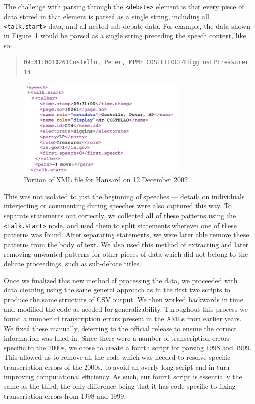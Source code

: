 \documentclass[
  letterpaper,
  DIV=11,
  numbers=noendperiod]{scrartcl}
\begin{document}
The challenge with parsing through the
\texttt{\textless{}debate\textgreater{}} element is that every piece of
data stored in that element is parsed as a single string, including all
\texttt{\textless{}talk.start\textgreater{}} data, and all nested
sub-debate data. For example, the data shown in
Figure~\ref{fig-patternEX} would be parsed as a single string preceding
the speech content, like so:

\begin{quote}
\texttt{09:31:0010261Costello,\ Peter,\ MPMr\ COSTELLOCT4HigginsLPTreasurer10}
\end{quote}

\begin{figure}

{\centering \includegraphics[width=3.28125in,height=\textheight]{patternEX.png}

}

\caption{\label{fig-patternEX}Portion of XML file for Hansard on 12
December 2002}

\end{figure}

This was not isolated to just the beginning of speeches --- details on
individuals interjecting or commenting during speeches were also
captured this way. To separate statements out correctly, we collected
all of these patterns using the
\texttt{\textless{}talk.start\textgreater{}} node, and used them to
split statements wherever one of these patterns was found. After
separating statements, we were later able remove these patterns from the
body of text. We also used this method of extracting and later removing
unwanted patterns for other pieces of data which did not belong to the
debate proceedings, such as sub-debate titles.

Once we finalized this new method of processing the data, we proceeded
with data cleaning using the same general approach as in the first two
scripts to produce the same structure of CSV output. We then worked
backwards in time and modified the code as needed for generalizability.
Throughout this process we found a number of transcription errors
present in the XMLs from earlier years. We fixed these manually,
deferring to the official release to ensure the correct information was
filled in. Since there were a number of transcription errors specific to
the 2000s, we chose to create a fourth script for parsing 1998 and 1999.
This allowed us to remove all the code which was needed to resolve
specific transcription errors of the 2000s, to avoid an overly long
script and in turn improving computational efficiency. As such, our
fourth script is essentially the same as the third, the only difference
being that it has code specific to fixing transcription errors from 1998
and 1999.
\end{document}
